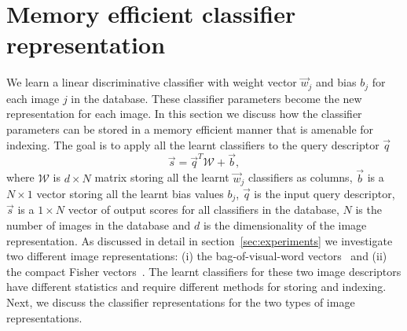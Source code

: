 

  \section{Memory efficient classifier representation}  
  \label{sec:memory}
  
We learn a linear discriminative classifier with weight vector $\vec{w}_j$ and bias $b_j$ for each image $j$ in the database.   
  These classifier parameters become the new representation for each image. 
  In this section we discuss how the classifier parameters can be stored in a memory efficient manner that is amenable for indexing. 
 The goal is to apply all the learnt classifiers to the query descriptor $\vec{q}$
      \begin{equation}
      \label{eq:allscores}
        \vec{s}=\vec{q}^T \mathcal{W}+\vec{b}, %
      \end{equation}
where $\mathcal{W}$ is $d\times N$ matrix storing all the learnt $\vec{w}_j$ classifiers as columns, $\vec{b}$ is a $N\times1$ vector storing all the learnt bias values $b_j$, 
$\vec{q}$ is the input query descriptor, $\vec{s}$ is a $1\times N$ vector of output scores for all classifiers in the database, $N$ is the number of images in the database  and $d$ is the dimensionality of the image representation. 
 As discussed in detail in section~\ref{sec:experiments} we investigate two different image representations:  (i) the bag-of-visual-word vectors~\cite{Sivic03} and (ii) the compact Fisher vectors~\cite{Jegou12}. The learnt classifiers for these two image descriptors have different statistics and require different methods for storing and indexing. Next, we discuss the classifier representations for the two types of image representations.
 
